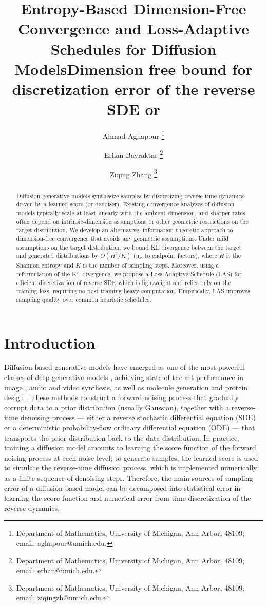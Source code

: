 \documentclass[11pt]{article}
\title{Entropy-Based Dimension-Free Convergence and Loss-Adaptive Schedules for Diffusion Models}
\title{Dimension free bound for discretization error of the reverse SDE or \blue{Sampling error of Diffusion model depends on target distribution entropy }}
\author{
  Ahmad Aghapour \thanks{Department of Mathematics, University of Michigan, Ann Arbor, 48109; email: aghapour@umich.edu. }
  \and
  Erhan Bayraktar \thanks{Department of Mathematics, University of Michigan, Ann Arbor, 48109; email: erhan@umich.edu. }
  \and
  Ziqing Zhang \thanks{Department of Mathematics, University of Michigan, Ann Arbor, 48109; email: ziqingzh@umich.edu. }
}
\date{}
\theoremstyle{definition}
\numberwithin{equation}{section}
\begin{document}
\maketitle



\begin{abstract}
Diffusion generative models synthesize samples by discretizing reverse-time dynamics driven by a learned score (or denoiser). Existing convergence analyses of diffusion models typically scale at least linearly with the ambient dimension, and sharper rates often depend on intrinsic-dimension assumptions or other geometric restrictions on the target distribution.
We develop an alternative, information-theoretic approach to dimension-free convergence that avoids any geometric assumptions. Under mild assumptions on the target distribution, we bound KL divergence between the target and generated distributions by $O(H^2/K)$ (up to endpoint factors), where $H$ is the Shannon entropy and $K$ is the number of sampling steps. 
Moreover, using a reformulation of the KL divergence, we propose a Loss-Adaptive Schedule (LAS) for efficient discretization of reverse SDE which is lightweight and relies only on the training loss, requiring no post-training heavy computation. Empirically, LAS improves sampling quality over common heuristic schedules.
\end{abstract}


\section{Introduction}
Diffusion-based generative models have emerged as one of the most powerful classes of deep generative models \cite{sohl2015deep,song2019generative,song2021scorebased}, achieving state-of-the-art performance in image \cite{dhariwal2021diffusion,ramesh2022hierarchical,rombach2022high}, audio \cite{kong2021diffwave,liu2023audioldm} and video \cite{ho2022video} synthesis, as well as molecule generation and protein design \cite{hoogeboom2022equivariant,corso2022diffdock,watson2023novo}. These methods construct a forward noising process that gradually corrupt data to a prior distribution (usually Gaussian), together with a reverse-time denoising process --- either a reverse stochastic differential equation (SDE) \cite{ho2020denoising} or a deterministic probability-flow ordinary differential equation (ODE) \cite{song2021denoising} --- that transports the prior distribution back to the data distribution. In practice, training a diffusion model amounts to learning the score function of the forward noising process at each noise level; to generate samples, the learned score is used to simulate the reverse-time diffusion process, which is implemented numerically as a finite sequence of denoising steps. Therefore, the main sources of sampling error of a diffusion-based model can be decomposed into statistical error in learning the score function and numerical error from time discretization of the reverse dynamics. 
\end{document}
